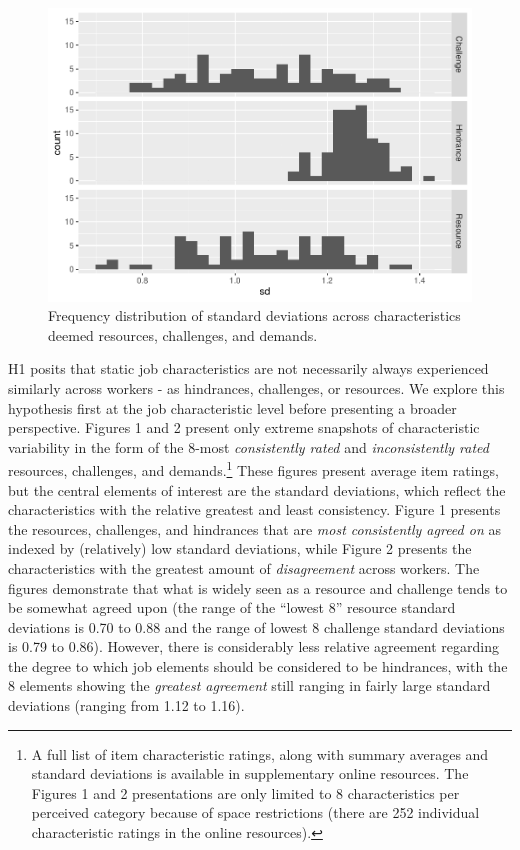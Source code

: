 \documentclass[
  man,mask]{apa6}
\begin{document}
\begin{figure}
\centering
\includegraphics{Submission_files/figure-latex/overallhist-1.pdf}
\caption{\label{fig:overallhist}Frequency distribution of standard deviations across characteristics deemed resources, challenges, and demands.}
\end{figure}

H1 posits that static job characteristics are not necessarily always experienced similarly across workers - as hindrances, challenges, or resources. We explore this hypothesis first at the job characteristic level before presenting a broader perspective. Figures 1 and 2 present only extreme snapshots of characteristic variability in the form of the 8-most \emph{consistently rated} and \emph{inconsistently rated} resources, challenges, and demands.\footnote{A full list of item characteristic ratings, along with summary averages and standard deviations is available in supplementary online resources. The Figures 1 and 2 presentations are only limited to 8 characteristics per perceived category because of space restrictions (there are 252 individual characteristic ratings in the online resources).} These figures present average item ratings, but the central elements of interest are the standard deviations, which reflect the characteristics with the relative greatest and least consistency. Figure 1 presents the resources, challenges, and hindrances that are \emph{most consistently agreed on} as indexed by (relatively) low standard deviations, while Figure 2 presents the characteristics with the greatest amount of \emph{disagreement} across workers. The figures demonstrate that what is widely seen as a resource and challenge tends to be somewhat agreed upon (the range of the ``lowest 8'' resource standard deviations is 0.70 to 0.88 and the range of lowest 8 challenge standard deviations is 0.79 to 0.86). However, there is considerably less relative agreement regarding the degree to which job elements should be considered to be hindrances, with the 8 elements showing the \emph{greatest agreement} still ranging in fairly large standard deviations (ranging from 1.12 to 1.16).
\end{document}
